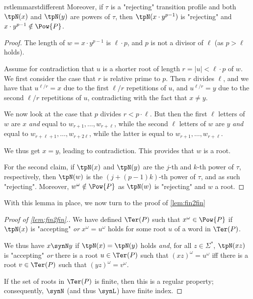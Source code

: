 \documentclass[a4paper,USenglish,cleveref,autoref,thm-restate]{lipics-v2021}
\begin{document}
{\begin{restatable}{rstlemma}{rstdifferent}
    Moreover, if $\tau$ is a "rejecting" transition profile and both $\tpN(x)$ and $\tpN(y)$ are powers of $\tau$, then $\tpN(x\cdot y^{p-1})$ is "rejecting" and $x\cdot y^{p-1} \notin \Pow{P}$.
\end{restatable}



\begin{proof}
    The length of $w = x\cdot y^{p-1}$ is $\ell \cdot p$, and $p$ is not a divisor of $\ell$ (as $p>\ell$ holds).

    Assume for contradiction that $u$ is a shorter root of length $r=|u| < \ell \cdot p$ of  $w$.
    We first consider the case that $r$ is relative prime to $p$. Then $r$ divides $\ell$, and we have that $u^{\ell/r} = x$ due to the first $\ell/r$ repetitions of $u$, and $u^{\ell/r} = y$ due to the second $\ell/r$ repetitions of $u$, contradicting with the fact that $x \neq y$.

    We now look at the case that $p$ divides $r < p\cdot \ell$.
But then the first $\ell$ letters of $w$ are $x$ \emph{and} equal to $w_{r+1},\ldots,w_{r+\ell}$, while the second $\ell$ letters of $w$ are $y$ \emph{and} equal to $w_{r+\ell+1},\ldots,w_{r+2\ell}$, while the latter is equal to $w_{r+1},\ldots,w_{r+\ell}$.

    We thus get $x=y$, leading to contradiction.
    This provides that $w$ is a root.

    For the second claim, if $\tpN(x)$ and $\tpN(y)$ are the $j$-th and $k$-th power of $\tau$, respectively, then $\tpN(w)$ is the $(j+(p-1)k)$-th power of $\tau$, and as such "rejecting". Moreover, $w^{\omega}\notin \Pow{P}$ as $\tpN(w)$ is "rejecting" and $w$ a root.
\end{proof}

With this lemma in place, we now turn to the proof of \cref{lem:fin2fin}

\begin{proof}[Proof of \cref{lem:fin2fin}.]
    We have defined $\Ter(P)$ such that $x^{\omega}\in \Pow{P}$ if $\tpN(x)$ is "accepting" \emph{or} $x^\omega = u^\omega$ holds for some root $u$ of a word in $\Ter(P)$.

    We thus have $x \synN y$ if $\tpN(x) = \tpN(y)$ holds \emph{and}, for all $z \in \Sigma^*$, $\tpN(xz)$ is "accepting" \emph{or} there is a root $u\in \Ter(P)$ such that $(xz)^\omega = u^\omega$ iff there is a root $v \in \Ter(P)$ such that $(yz)^\omega = v^\omega$.

    If the set of roots in $\Ter(P)$ is finite, then this is a regular property; consequently, $\synN$ (and thus $\synL$) have finite index.


\end{proof}}
\end{document}
